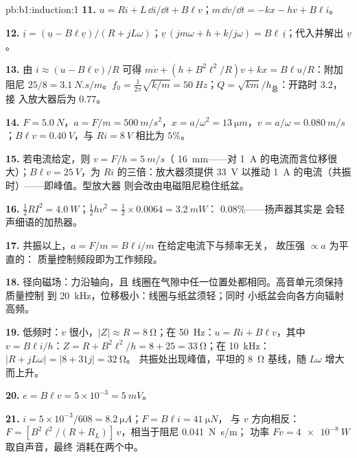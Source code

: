 \begin{solution}{pb:b1:induction:1}
\textbf{11.} $u = Ri + L\,\dd i/\dd t + B\ell v$；$m\,\dd v/\dd t = -kx - hv + B\ell i$。

\textbf{12.} $\underline i = (\underline u - B\ell\underline v)/(R + jL\omega)$；$\underline v\,(jm\omega + h +
k/j\omega) = B\ell\,\underline i$；代入并解出 $\underline v$。

\textbf{13.} 由 $i \approx (u - B\ell v)/R$ 可得 $m\dot v + (h + B^2\ell^2/R)v + kx =
B\ell u/R$：附加阻尼 $25/8 = \qty{3.1}{N.s/m}$。$f_0 = \tfrac1{2\pi}\sqrt{k/m} =
\qty{50}{Hz}$；$Q = \sqrt{km}/h_{\text{总}}$：开路时 $3.2$，接
入放大器后为 $0.77$。

\textbf{14.} $F = \qty{5.0}{N}$，$a = F/m = \qty{500}{m/s^2}$，$x = a/\omega^2 =
\qty{13}{\micro m}$，$v = a/\omega = \qty{0.080}{m/s}$；$B\ell v = \qty{0.40}{V}$，与
$Ri = \qty{8}{V}$ 相比为 $5\%$。

\textbf{15.} 若电流给定，则 $v = F/h = \qty{5}{m/s}$（
 \qty{16}{mm}——对 \qty{1}{A} 的电流而言位移很大）；$B\ell v =
\qty{25}{V}$，为 $Ri$ 的三倍：放大器须提供 \qty{33}{V} 以推动
\qty{1}{A} 的电流（共振时）——即峰值。型放大器
则会改由电磁阻尼稳住纸盆。

\textbf{16.} $\tfrac12RI^2 = \qty{4.0}{W}$；$\tfrac12hv^2 = \tfrac12 \times 0.0064 =
\qty{3.2}{mW}$： $0.08\%$——扬声器其实是
会轻声细语的加热器。

\textbf{17.} 共振以上，$a = F/m = B\ell i/m$ 在给定电流下与频率无关，
故压强 $\propto a$ 为平直的：
质量控制频段即为工作频段。

\textbf{18.} 径向磁场：力沿轴向，且
线圈在气隙中任一位置处都相同。高音单元须保持质量控制
到 \qty{20}{kHz}，位移极小：线圈与纸盆须轻；同时
小纸盆会向各方向辐射高频。

\textbf{19.} 低频时：$v$ 很小，$|Z| \approx R = \qty{8}{\ohm}$；在
\qty{50}{Hz}：$u = Ri + B\ell v$，其中 $v = B\ell i/h$：$Z = R + B^2\ell^2/h = 8 + 25 =
\qty{33}{\ohm}$；在 \qty{10}{kHz}：$|R + jL\omega| = |8 + 31j| = \qty{32}{\ohm}$。
共振处出现峰值，平坦的 \qty{8}{\ohm} 基线，随 $L\omega$ 增大而上升。

\textbf{20.} $e = B\ell v = 5 \times 10^{-3} = \qty{5}{mV}$。

\textbf{21.} $i = 5 \times 10^{-3}/608 = \qty{8.2}{\micro A}$；$F = B\ell i = \qty{41}{\micro N}$，
与 $v$ 方向相反：$F = [B^2\ell^2/(R + R_L)]\,v$，相当于阻尼 \qty{0.041}{N.s/m}；
功率 $Fv = \qty{4e-8}{W}$ 取自声音，最终
消耗在两个中。


\end{solution}
